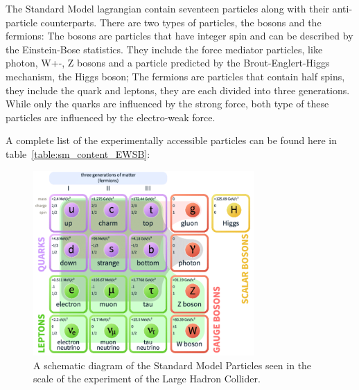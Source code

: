      The Standard Model lagrangian contain seventeen particles along with their anti-particle counterparts. There are two types of particles, the bosons and the fermions: The bosons are particles that have integer spin and can be described by the Einstein-Bose statistics. They include the force mediator particles, like photon, W+-, Z bosons and a particle predicted by the Brout-Englert-Higgs mechanism, the Higgs boson; The fermions are particles that contain half spins, they include the quark
     and leptons, they are each divided into three generations. While only the quarks are influenced by the strong force, both type of these particles are influenced by the electro-weak force.

     A complete list of the experimentally accessible particles can be found here in table~\ref{table:sm_content_EWSB}:

    \begin{figure}[!htb]
        \begin{center}
            \includegraphics[width=0.75\textwidth]{figures/chapter_SM/SM}
            \caption{
                A schematic diagram of the Standard Model Particles seen in the scale of the experiment of the Large Hadron Collider.
            }
            \label{fig:SM}
        \end{center}
    \end{figure}

